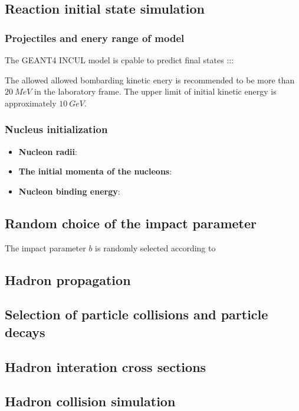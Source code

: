 \subsection{Reaction initial state simulation}
\subsubsection{Projectiles and enery range of model}

The GEANT4 INCUL model is cpable to predict final states :::

The allowed allowed bombarding kinetic enery is recommended to be more than 
$20~MeV$ in the laboratory frame. 
The upper limit of initial kinetic energy is approximately $10~GeV$.

\subsubsection{Nucleus initialization}

\begin{itemize}
\item {\bf Nucleon radii}:
\item {\bf The initial momenta of the nucleons}:
\item {\bf Nucleon binding energy}:
\end{itemize}
\subsection{Random choice of the impact parameter}

The impact parameter $b$ is randomly selected according to
\subsection{Hadron propagation}

\subsection{Selection of particle collisions and particle decays}

\subsection{Hadron interation cross sections}

\subsection{Hadron collision simulation}

